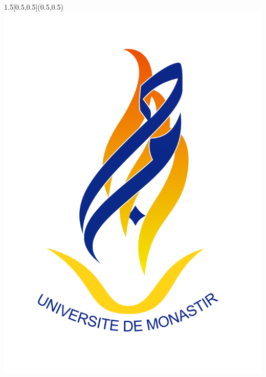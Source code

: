 \begin{titlepage}
\begin{textblock}{1.5}[0.5,0.5](0.5,0.5)
	\includegraphics[width=\linewidth]{images/UM_logo.png}\\[3.5cm]
  \end{textblock}
  

\end{titlepage}
